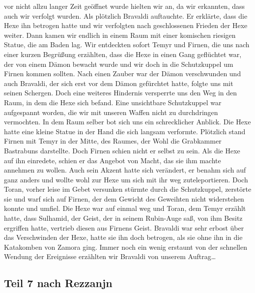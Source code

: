 vor nicht allzu langer Zeit geöffnet wurde hielten wir an, da wir erkannten, dass auch wir verfolgt wurden. Als plötzlich Bravaldi auftauchte. Er erklärte, dass die Hexe ihn betrogen hatte und wir verfolgten nach geschlossenen Frieden der Hexe weiter. Dann kamen wir endlich in einem Raum mit einer komischen riesigen Statue, die am Baden lag. Wir entdeckten sofort Temyr und Firnen, die uns nach einer kurzen Begrüßung erzählten, dass die Hexe in einen Gang geflüchtet war, der von einem Dämon bewacht wurde und wir doch in die Schutzkuppel um Firnen kommen sollten. Nach einen Zauber war der Dämon verschwunden und auch Bravaldi, der sich erst vor dem Dämon gefürchtet hatte, folgte uns mit seinen Schergen. Doch eine weiteres Hindernis versperrte uns den Weg in den Raum, in dem die Hexe sich befand. Eine unsichtbare Schutzkuppel war aufgespannt worden, die wir mit unseren Waffen nicht zu durchdringen vermochten. In dem Raum selber bot sich uns ein schrecklicher Anblick. Die Hexe hatte eine kleine Statue in der Hand die sich langsam verformte. Plötzlich stand Firnen mit Temyr in der Mitte, des Raumes, der Wohl die Grabkammer Bastrabuns darstellte. Doch Firnen schien nicht er selbst zu sein. Als die Hexe auf ihn einredete, schien er das Angebot von Macht, das sie ihm machte annehmen zu wollen. Auch sein Akzent hatte sich verändert, er benahm sich auf ganz anders und wollte wohl zur Hexe um sich mit ihr weg zuteleportieren. Doch Toran, vorher leise im Gebet versunken stürmte durch die Schutzkuppel, zerstörte sie und warf sich auf Firnen, der dem Gewicht des Geweihten nicht widerstehen konnte und umfiel. Die Hexe war auf einmal weg und Toran, dem Temyr erzählt hatte, dass Sulhamid, der Geist, der in seinem Rubin-Auge saß, von ihm Besitz ergriffen hatte, vertrieb diesen aus Firnens Geist. Bravaldi war sehr erbost über das Verschwinden der Hexe, hatte sie ihn doch betrogen, als sie ohne ihn in die Katakomben von Zamora ging. Immer noch ein wenig erstaunt von der schnellen Wendung der Ereignisse erzählten wir Bravaldi von unserem Auftrag\dots

\subsection{Teil 7 nach Rezzanjn}

